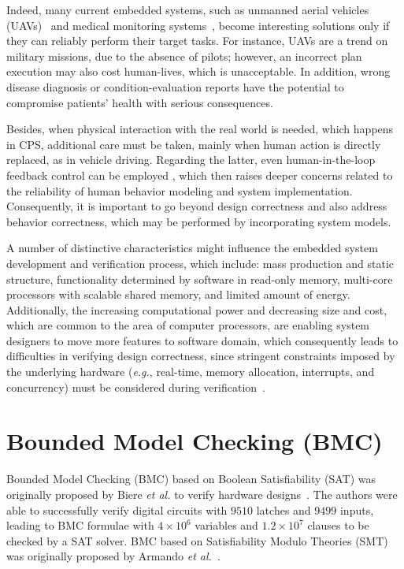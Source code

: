 \documentclass{acm_sen_article}
\begin{document}
Indeed, many current embedded systems, such as unmanned aerial vehicles (UAVs)~\cite{groza2015formal} and medical monitoring systems~\cite{Cordeiro09}, become interesting solutions only if they can reliably perform their target tasks. For instance, UAVs are a trend on military missions, due to the absence of pilots; however, an incorrect plan execution may also cost human-lives, which is unacceptable. In addition, wrong disease diagnosis or condition-evaluation reports have the potential to compromise patients' health with serious consequences.

Besides, when physical interaction with the real world is needed, which happens in CPS, additional care must be taken, mainly when human action is directly replaced, as in vehicle driving. Regarding the latter, even human-in-the-loop feedback control can be employed \cite{munir}, which then raises deeper concerns related to the reliability of human behavior modeling and system implementation. Consequently, it is important to go beyond design correctness and also address behavior correctness, which may be performed by incorporating system models.

A number of distinctive characteristics might influence the embedded system development and verification process, which include: mass production and static structure, functionality determined by software in read-only memory, multi-core processors with scalable shared memory, and limited amount of energy. Additionally, the increasing computational power and decreasing size and cost, which are common to the area of computer processors, are enabling system designers to move more features to software domain, which consequently leads to difficulties in verifying design correctness, since stringent constraints imposed by the underlying hardware ({\it e.g.}, real-time, memory allocation, interrupts, and concurrency) must be considered during verification~\cite{Kroening15}.

\section{Bounded Model Checking (BMC)}

Bounded Model Checking (BMC) based on Boolean Satisfiability (SAT) was originally proposed by Biere {\it et al.} to verify hardware designs~\cite{Biere99,handbook09}. The authors were able to successfully verify digital circuits with $9510$ latches and $9499$ inputs, leading to BMC formulae with $4 \times 10^6$ variables and $1.2 \times 10^7$ clauses to be checked by a SAT solver. BMC based on Satisfiability Modulo Theories (SMT)~\cite{BarrettSST09} was originally proposed by Armando {\it et al.}~\cite{Armando06}. 
\end{document}
